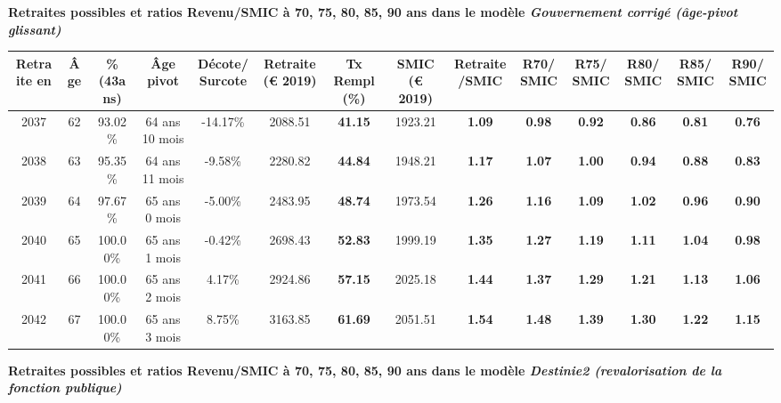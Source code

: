  \vspace{0.1cm} 
{\bf \noindent Retraites possibles et ratios Revenu/SMIC à 70, 75, 80, 85, 90 ans dans le modèle \emph{Gouvernement corrigé (âge-pivot glissant)}}  
 
\begin{adjustbox}{max width=\textwidth} 
\begin{tabular}[htb]{|c|c||c|c|c||c|c||c|c||c|c|c|c|c|} 
\hline 
 Retraite en &  Âge &  \%(43ans) &  Âge pivot &  Décote/Surcote &  Retraite (\euro{} 2019) &  Tx Rempl(\%) &  SMIC (\euro{} 2019) &  Retraite/SMIC &  R70/SMIC &  R75/SMIC &  R80/SMIC &  R85/SMIC &  R90/SMIC \\ 
\hline \hline 
 2037 &  62 &  93.02\% &  64 ans 10 mois &  -14.17\% &  2088.51 &  {\bf 41.15} &  1923.21 &  {\bf 1.09} &  {\bf {\color{red} 0.98}} &  {\bf {\color{red} 0.92}} &  {\bf {\color{red} 0.86}} &  {\bf {\color{red} 0.81}} &  {\bf {\color{red} 0.76}} \\ 
\hline 
 2038 &  63 &  95.35\% &  64 ans 11 mois &  -9.58\% &  2280.82 &  {\bf 44.84} &  1948.21 &  {\bf 1.17} &  {\bf 1.07} &  {\bf 1.00} &  {\bf {\color{red} 0.94}} &  {\bf {\color{red} 0.88}} &  {\bf {\color{red} 0.83}} \\ 
\hline 
 2039 &  64 &  97.67\% &  65 ans 0 mois &  -5.00\% &  2483.95 &  {\bf 48.74} &  1973.54 &  {\bf 1.26} &  {\bf 1.16} &  {\bf 1.09} &  {\bf 1.02} &  {\bf {\color{red} 0.96}} &  {\bf {\color{red} 0.90}} \\ 
\hline 
 2040 &  65 &  100.00\% &  65 ans 1 mois &  -0.42\% &  2698.43 &  {\bf 52.83} &  1999.19 &  {\bf 1.35} &  {\bf 1.27} &  {\bf 1.19} &  {\bf 1.11} &  {\bf 1.04} &  {\bf {\color{red} 0.98}} \\ 
\hline 
 2041 &  66 &  100.00\% &  65 ans 2 mois &  4.17\% &  2924.86 &  {\bf 57.15} &  2025.18 &  {\bf 1.44} &  {\bf 1.37} &  {\bf 1.29} &  {\bf 1.21} &  {\bf 1.13} &  {\bf 1.06} \\ 
\hline 
 2042 &  67 &  100.00\% &  65 ans 3 mois &  8.75\% &  3163.85 &  {\bf 61.69} &  2051.51 &  {\bf 1.54} &  {\bf 1.48} &  {\bf 1.39} &  {\bf 1.30} &  {\bf 1.22} &  {\bf 1.15} \\ 
\hline 
\hline 
\end{tabular} 
\end{adjustbox} 
 
 \vspace{0.1cm} 
{\bf \noindent Retraites possibles et ratios Revenu/SMIC à 70, 75, 80, 85, 90 ans dans le modèle \emph{Destinie2 (revalorisation de la fonction publique)}}  
 
